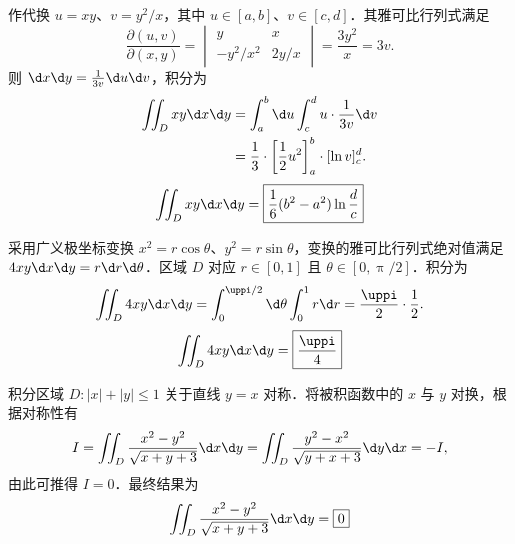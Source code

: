 \begin{solution}
    作代换 $u = xy$、$v = y^2/x$，其中 $u \in [a, b]$、$v \in [c, d]$．其雅可比行列式满足
    \begin{equation}
        \frac{\partial(u,v)}{\partial(x,y)} = \begin{vmatrix} y & x \\ -y^2/x^2 & 2y/x \end{vmatrix} = \frac{3y^2}{x} = 3v.
    \end{equation}
    则 $\d x \d y = \frac{1}{3v} \d u \d v$，积分为
    \begin{equation}
        \begin{aligned}
            \iint_D xy \d x \d y & = \int_a^b \d u \int_c^d u \cdot \frac{1}{3v} \d v                       \\
                                 & = \frac{1}{3} \cdot \left[ \frac{1}{2}u^2 \right]_a^b \cdot [\ln v]_c^d.
        \end{aligned}
    \end{equation}
    \begin{equation}
        \iint_D xy \d x \d y = \boxed{\frac{1}{6}(b^2-a^2) \ln \frac{d}{c}}
    \end{equation}


    采用广义极坐标变换 $x^2 = r \cos \theta$、$y^2 = r \sin \theta$，变换的雅可比行列式绝对值满足 $4xy \d x \d y = r \d r \d \theta$．区域 $D$ 对应 $r \in [0, 1]$ 且 $\theta \in [0, \uppi/2]$．积分为
    \begin{equation}
        \iint_D 4xy \d x \d y = \int_0^{\uppi/2} \d \theta \int_0^1 r \d r = \frac{\uppi}{2} \cdot \frac{1}{2}.
    \end{equation}
    \begin{equation}
        \iint_D 4xy \d x \d y = \boxed{\frac{\uppi}{4}}
    \end{equation}


    积分区域 $D: |x|+|y| \leqslant 1$ 关于直线 $y=x$ 对称．将被积函数中的 $x$ 与 $y$ 对换，根据对称性有
    \begin{equation}
        I = \iint_D \frac{x^2-y^2}{\sqrt{x+y+3}} \d x \d y = \iint_D \frac{y^2-x^2}{\sqrt{y+x+3}} \d y \d x = -I,
    \end{equation}
    由此可推得 $I = 0$．最终结果为
    \begin{equation}
        \iint_D \frac{x^2-y^2}{\sqrt{x+y+3}} \d x \d y = \boxed{0}
    \end{equation}


\end{solution}

